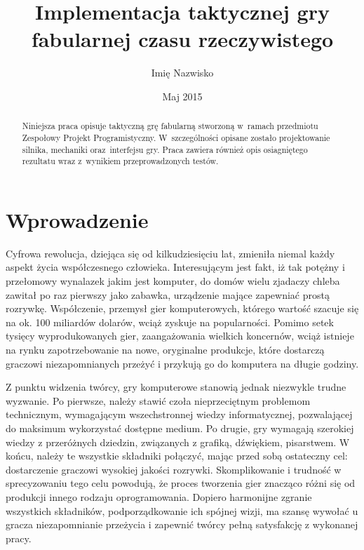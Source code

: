 \documentclass[licencjacka]{pracamgr}
\author	{Imię Nazwisko}
\title{Implementacja taktycznej gry fabularnej czasu rzeczywistego}
\date{Maj 2015}
\begin{document}
\maketitle

\begin{abstract}
  Niniejsza praca opisuje taktyczną grę fabularną stworzoną
  w~ramach przedmiotu Zespołowy Projekt Programistyczny.
  W~szczególności opisane zostało projektowanie silnika,
  mechaniki oraz~interfejsu gry. Praca zawiera również
  opis osiagniętego rezultatu wraz z~wynikiem przeprowadzonych testów.
\end{abstract}

\tableofcontents

\chapter*{Wprowadzenie}
Cyfrowa rewolucja, dziejąca się od kilkudziesięciu lat, zmieniła niemal każdy aspekt życia współczesnego człowieka.
Interesującym jest fakt, iż tak potężny i przełomowy wynalazek jakim jest komputer, do domów wielu zjadaczy chleba
zawitał po raz pierwszy jako zabawka, urządzenie mające zapewniać prostą rozrywkę. Współczenie, przemysł
gier komputerowych, którego wartość szacuje się na ok. 100 miliardów dolarów, wciąż zyskuje na popularności.
Pomimo setek tysięcy wyprodukowanych gier, zaangażowania wielkich koncernów, wciąż istnieje na rynku zapotrzebowanie
na nowe, oryginalne produkcje, które dostarczą graczowi niezapomnianych przeżyć i przykują go do komputera na długie godziny.

Z punktu widzenia twórcy, gry komputerowe stanowią jednak niezwykle trudne wyzwanie. Po pierwsze, należy stawić czoła
nieprzeciętnym problemom technicznym, wymagającym wszechstronnej wiedzy informatycznej, pozwalającej do maksimum wykorzystać
dostępne medium. Po drugie, gry wymagają szerokiej wiedzy z przeróżnych dziedzin, związanych z
grafiką, dźwiękiem, pisarstwem. W końcu, należy te wszystkie składniki połączyć, mając przed sobą ostateczny cel: dostarczenie
graczowi wysokiej jakości rozrywki. Skomplikowanie i trudność w sprecyzowaniu tego celu powodują, że proces tworzenia gier
znacząco różni się od produkcji innego rodzaju oprogramowania. Dopiero harmonijne zgranie wszystkich składników, podporządkowanie
ich spójnej wizji, ma szansę wywołać u gracza niezapomnianie przeżycia i zapewnić twórcy pełną satysfakcję z wykonanej pracy.
\end{document}
